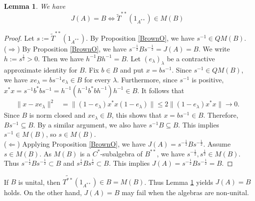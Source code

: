 \documentclass[12pt]{amsart}
\newtheorem{lemma}[theorem]{Lemma}
\theoremstyle{remark}
\begin{document}
\begin{lemma}\label{equi}
     We have 
     \[
     J(A)=B \Longleftrightarrow  \widetilde{T}^{**}(1_{A^{**}}) \in M(B)
     \]
\end{lemma}
\begin{proof}
   Let  $s:=\widetilde{T}^{**}(1_{A^{**}})$. By Proposition \ref{BrownO}, we have $s^ {-1}\in QM(B)$. \\
   ($\Rightarrow$) By Proposition \ref{BrownO}, we have $s^{-\frac{1}{2}}Bs ^{-\frac{1}{2}}=J(A)=B$. We write $h:=s^{\frac{1}{2}}>0$. Then we have $h^{-1}Bh^{-1}= B$. 
Let $(e_\lambda)_\lambda$ be a contractive approximate identity for
$B$. Fix $b\in B$ and put $x=bs^{-1}$. Since $s^{-1} \in QM(B)$, we have
$xe_\lambda=bs^{-1}e_{\lambda} \in B$ for every
$\lambda$. Furthermore, since $s^{-1}$ is positive, $ x^*x=s^{-1} b^*b s^{-1}=h^{-1}(h^{-1}b^{*}bh^{-1})h^{-1}\in B$. 
It follows that
\[
\begin{aligned}
    \lVert x-xe_\lambda\rVert^2
    &=\| (1-e_\lambda)x^*x(1-e_\lambda)\| \le 2\|(1-e_\lambda)x^{*}x\|
      \longrightarrow 0.
\end{aligned}
\]
Since $B$ is norm closed and $xe_\lambda \in B$, this shows that $x=bs^{-1} \in B$. Therefore,
$Bs^{-1}\subseteq B$. By a similar argument, we also have $s^{-1}B\subseteq B$. This implies $s^{-1}\in M(B)$, so $s \in M(B)$.  
\\
($\Leftarrow$) Applying Proposition \ref{BrownO}, we have $J(A)=s^{-\frac{1}{2}}Bs^{-\frac{1}{2}}$. Assume $s \in M(B)$. As $M(B)$ is a $C^{*}$-subalgebra of $B^{**}$, we have $s^{-\frac{1}{2}},  s^{\frac{1}{2}} \in M(B)$. Thus $s^{-\frac{1}{2}}Bs^{-\frac{1}{2}} \subset B$ and $s^{\frac{1}{2}}Bs^{\frac{1}{2}} \subset B$. This implies $J(A)=s^{-\frac{1}{2}}Bs^{-\frac{1}{2}}=B$.
\end{proof}


If $B$ is unital, then $\widetilde{T^{**}}(1_{A^{**}}) \in B=M(B)$. Thus Lemma \ref{equi} yields $J(A)=B$ holds. On the other hand, $J(A)=B$ may fail when the algebras are
non-unital.
\end{document}
